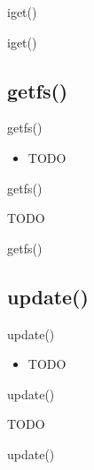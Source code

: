 \documentclass{beamer}
\begin{document}
\begin{frame}{iget()}
\end{frame}

\begin{frame}{iget()}
\end{frame}




\subsection{getfs()}

\begin{frame}{getfs()}
    \begin{itemize}
        \item TODO
    \end{itemize}
\end{frame}

\begin{frame}{getfs()}
    \begin{algorithmic}[1]
        \State TODO
    \end{algorithmic}
\end{frame}

\begin{frame}{getfs()}
\end{frame}




\subsection{update()}

\begin{frame}{update()}
    \begin{itemize}
        \item TODO
    \end{itemize}
\end{frame}

\begin{frame}{update()}
    \begin{algorithmic}[1]
        \State TODO
    \end{algorithmic}
\end{frame}

\begin{frame}{update()}
\end{frame}
\end{document}
